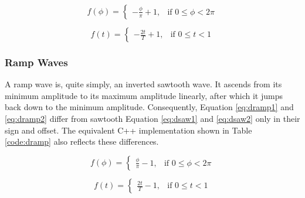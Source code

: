\documentclass[12pt,twoside]{report}
\begin{document}
\begin{multicols}{2}

    \begin{equation}
      f(\phi) =
      \begin{cases}
        -\frac{\phi}{\pi} + 1,& \text{if } 0 \leq \phi < 2 \pi
      \end{cases}
      \label{eq:dsaw1}
    \end{equation}

    \begin{equation}
      f(t) =
      \begin{cases}
        -\frac{2t}{T} + 1,& \text{if } 0 \leq t < 1
      \end{cases}
      \label{eq:dsaw2}
    \end{equation}

\end{multicols}

\begin{table}
\end{table}

\subsubsection{Ramp Waves}

A ramp wave is, quite simply, an inverted sawtooth wave. It ascends from its minimum amplitude to its maximum amplitude linearly, after which it jumps back down to the minimum amplitude. Consequently, Equation  \ref{eq:dramp1} and \ref{eq:dramp2} differ from sawtooth Equation  \ref{eq:dsaw1} and \ref{eq:dsaw2} only in their sign and offset. The equivalent C++ implementation shown in Table \ref{code:dramp} also reflects these differences.

\begin{multicols}{2}

  \begin{equation}
    f(\phi) =
    \begin{cases}
      \frac{\phi}{\pi} - 1,& \text{if } 0 \leq \phi < 2 \pi
    \end{cases}
    \label{eq:dramp1}
  \end{equation}

  \begin{equation}
    f(t) =
    \begin{cases}
      \frac{2t}{T} - 1,& \text{if } 0 \leq t < 1
    \end{cases}
    \label{eq:dramp2}
  \end{equation}

\end{multicols}
\end{document}
